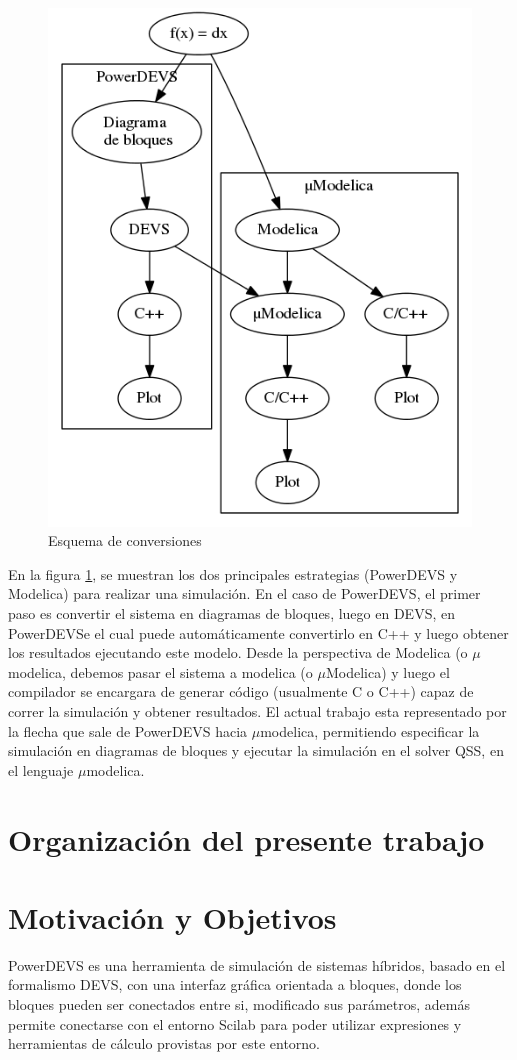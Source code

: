 \begin{figure}[H]
\centering
 \includegraphics[width=0.75\linewidth]{esquema}
 \caption{Esquema de conversiones}
 \label{fig:esquema}
\end{figure}

En la figura \ref{fig:esquema}, se muestran los dos principales estrategias (PowerDEVS y Modelica) para realizar una simulación. En el caso de PowerDEVS, el primer paso es convertir el sistema en diagramas de bloques, luego en DEVS, en PowerDEVSe el cual puede automáticamente convertirlo en C++ y luego obtener los resultados ejecutando este modelo. Desde la perspectiva de Modelica (o $\mu$modelica, debemos pasar el sistema a modelica (o $\mu$Modelica) y luego el compilador se encargara de generar código (usualmente C o C++) capaz de correr la simulación y obtener resultados.
El actual trabajo esta representado por la flecha que sale de PowerDEVS hacia $\mu$modelica, permitiendo especificar la simulación en diagramas de bloques y ejecutar la simulación en el solver QSS, en el lenguaje $\mu$modelica.

\section{Organización del presente trabajo}

\section{Motivación y Objetivos}
PowerDEVS\cite{BK11} es una herramienta de simulación de sistemas híbridos, basado en el formalismo DEVS\cite{Zeigler:2000:TMS:580780}, con una interfaz gráfica orientada a bloques, donde los bloques pueden ser conectados entre si, modificado sus parámetros, además permite conectarse con el entorno Scilab para poder utilizar expresiones y herramientas de cálculo provistas por este entorno.

